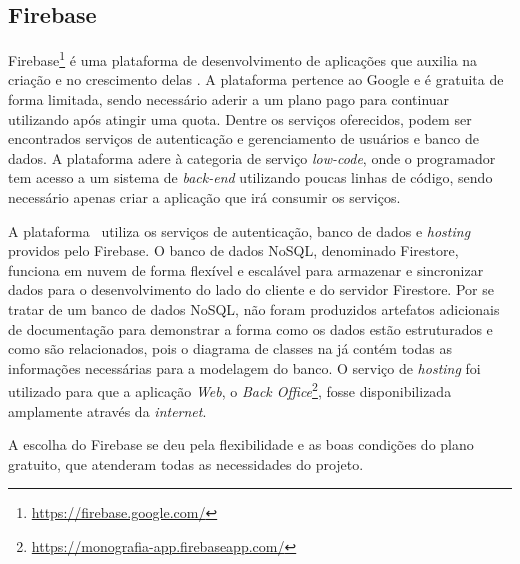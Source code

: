 \subsection{Firebase}
\label{firebase}

Firebase\footnote{\url{https://firebase.google.com/}} é uma plataforma de desenvolvimento de aplicações que auxilia na criação e no crescimento delas \cite{firebase}. A plataforma pertence ao Google e é gratuita de forma limitada, sendo necessário aderir a um plano pago para continuar utilizando após atingir uma quota. Dentre os serviços oferecidos, podem ser encontrados serviços de autenticação e gerenciamento de usuários e banco de dados. A plataforma adere à categoria de serviço \textit{low-code}, onde o programador tem acesso a um sistema de \textit{back-end} utilizando poucas linhas de código, sendo necessário apenas criar a aplicação que irá consumir os serviços.

A plataforma \appName\ utiliza os serviços de autenticação, banco de dados e \textit{hosting} providos pelo Firebase. O banco de dados NoSQL, denominado Firestore\cite{firestore}, funciona em nuvem de forma flexível e escalável para armazenar e sincronizar dados para o desenvolvimento do lado do cliente e do servidor Firestore. Por se tratar de um banco de dados NoSQL, não foram produzidos artefatos adicionais de documentação para demonstrar a forma como os dados estão estruturados e como são relacionados, pois o diagrama de classes na  já contém todas as informações necessárias para a modelagem do banco. O serviço de \textit{hosting} foi utilizado para que a aplicação \textit{Web}, o \textit{Back Office}\footnote{\url{https://monografia-app.firebaseapp.com/}}, fosse disponibilizada amplamente através da \textit{internet}.

A escolha do Firebase se deu pela flexibilidade e as boas condições do plano gratuito, que atenderam todas as necessidades do projeto.
